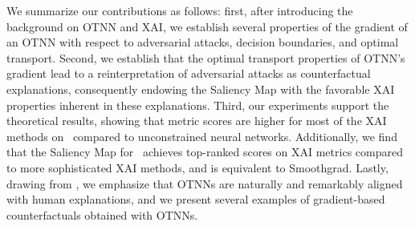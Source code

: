 We summarize our contributions as follows: first, after introducing the background on OTNN and XAI, we establish several properties of the gradient of an OTNN with respect to adversarial attacks, decision boundaries, and optimal transport. Second, we establish that the optimal transport properties of OTNN's gradient lead to a reinterpretation of adversarial attacks as counterfactual explanations, consequently endowing the Saliency Map with the favorable XAI properties inherent in these explanations. Third, our experiments support the theoretical results, showing that 
metric scores are higher for most of the XAI methods on \otnn~compared to unconstrained neural networks. Additionally, we find that the Saliency Map for \otnn~achieves top-ranked  scores on XAI metrics compared to more sophisticated XAI methods, and is equivalent to Smoothgrad. 
Lastly, drawing from \cite{fel2022aligning}, we emphasize that OTNNs are naturally and remarkably aligned with human explanations, and we present several examples of gradient-based counterfactuals obtained with OTNNs. 


